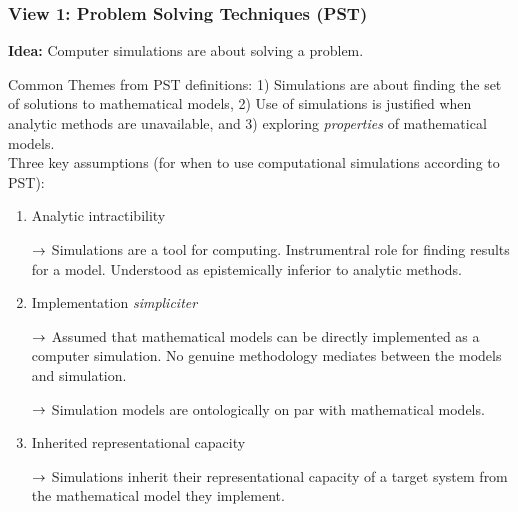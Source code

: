 \subsubsection{View 1: Problem Solving Techniques (PST)}

{\bf Idea:} Computer simulations are about solving a problem. \\




Common Themes from PST definitions: 1) Simulations are about finding the set of solutions to mathematical models, 2) Use of simulations is justified when analytic methods are unavailable, and 3) exploring {\it properties} of mathematical models. \\



Three key assumptions (for when to use computational simulations according to PST):
\begin{enumerate}
	\item Analytic intractibility

	$\rightarrow$ Simulations are a tool for computing. Instrumentral role for finding results for a model. Understood as epistemically inferior to analytic methods.

	\item Implementation {\it simpliciter}

	$\rightarrow$ Assumed that mathematical models can be directly implemented as a computer simulation. No genuine methodology mediates between the models and simulation.

	$\rightarrow$ Simulation models are ontologically on par with mathematical models.

	\item Inherited representational capacity

	$\rightarrow$ Simulations inherit their representational capacity of a target system from the mathematical model they implement.
\end{enumerate}

